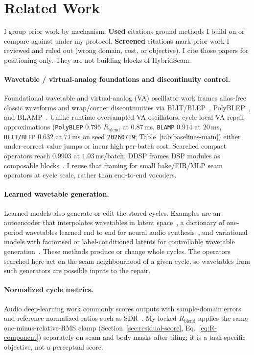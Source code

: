 \section{Related Work}
\label{sec:related_work}

I group prior work by mechanism.
\textbf{Used} citations ground methods I build on or compare against under my protocol.
\textbf{Screened} citations mark prior work I reviewed and ruled out (wrong domain, cost, or objective).
I cite those papers for positioning only.
They are not building blocks of HybridSeam.

\paragraph{Wavetable / virtual-analog foundations and discontinuity control.}
Foundational wavetable and virtual-analog (VA) oscillator work frames alias-free classic waveforms and wrap/corner discontinuities via BLIT/BLEP~\citep{stilson1996,valimaki2007polyblep}, PolyBLEP~\citep{valimaki2007polyblep}, and BLAMP~\citep{esqueda2016blamp}.
Unlike runtime oversampled VA oscillators, cycle-local VA repair approximations (\texttt{PolyBLEP} $0.795$ $R_{\mathrm{blend}}$ at $0.87$\,ms, \texttt{BLAMP} $0.914$ at $20$\,ms, \texttt{BLIT/BLEP} $0.632$ at $71$\,ms on seed \texttt{20260719}; Table~\ref{tab:baselines-main}) either under-correct value jumps or incur high per-batch cost. Searched compact operators reach $0.9903$ at $1.03$\,ms/batch.
DDSP frames DSP modules as composable blocks~\citep{engel2020}.
I reuse that framing for small bake/FIR/MLP seam operators at cycle scale, rather than end-to-end vocoders.

\paragraph{Learned wavetable generation.}
Learned models also generate or edit the stored cycles. Examples are an autoencoder that interpolates wavetables in latent space~\citep{hantrakul2018neuralwt}, a dictionary of one-period wavetables learned end to end for neural audio synthesis~\citep{shan2021dwts}, and variational models with factorised or label-conditioned latents for controllable wavetable generation~\citep{lee2024wavespace,yutani2024cvae}.
These methods produce or change whole cycles.
The operators searched here act on the seam neighbourhood of a given cycle, so wavetables from such generators are possible inputs to the repair.

\paragraph{Normalized cycle metrics.}
Audio deep-learning work commonly scores outputs with sample-domain errors and reference-normalized ratios such as SDR~\citep{purwins2019,stoller2018}.
My locked $R_{\mathrm{blend}}$ applies the same one-minus-relative-RMS clamp (Section~\ref{sec:residual-score}, Eq.~\eqref{eq:R-component}) separately on seam and body masks after tiling; it is a task-specific objective, not a perceptual score.

